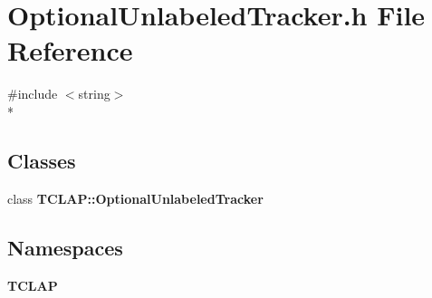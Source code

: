 \section{Optional\+Unlabeled\+Tracker.\+h File Reference}
\label{OptionalUnlabeledTracker_8h}
{\ttfamily \#include $<$string$>$}\\*
\subsection*{Classes}
\begin{DoxyCompactItemize}
\item 
class {\bf T\+C\+L\+A\+P\+::\+Optional\+Unlabeled\+Tracker}
\end{DoxyCompactItemize}
\subsection*{Namespaces}
\begin{DoxyCompactItemize}
\item 
 {\bf T\+C\+L\+A\+P}
\end{DoxyCompactItemize}
